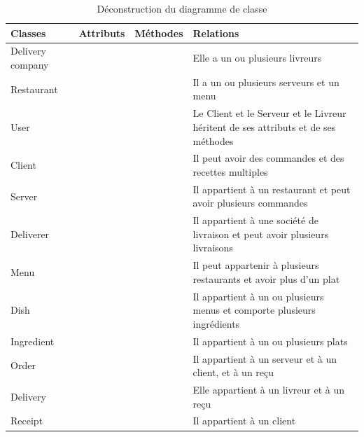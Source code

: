 \documentclass[french, a4paper, 12pt]{report}
\begin{document}
			\begin{table}[!h!]
  				\begin{tabular}{lllp{6cm}}
    					Classes & Attributs & Méthodes & Relations \\ 

					\hline
    					Delivery company & & & Elle a un ou plusieurs livreurs \\  
    					
    					\hline
    					Restaurant & & & Il a un ou plusieurs serveurs et un menu \\   					
    					
    					\hline
    					User & & & Le Client et le Serveur et le Livreur héritent de ses attributs et de ses méthodes \\
    					
					\hline
    					Client & & & Il peut avoir des commandes et des recettes multiples\\  
    					  					
    					\hline
    					Server & & & Il appartient à un restaurant et peut avoir plusieurs commandes \\
    					
    					\hline
    					Deliverer & & & Il appartient à une société de livraison et peut avoir plusieurs livraisons \\
    					    					
    					\hline
    					Menu & & & Il peut appartenir à plusieurs restaurants et avoir plus d'un plat\\
    					
    					\hline
					Dish & & & Il appartient à un ou plusieurs menus et comporte plusieurs ingrédients \\

						
					\hline
					Ingredient & & & Il appartient à un ou plusieurs plats \\
						
					\hline
					Order & & & Il appartient à un serveur et à un client, et à un reçu \\
						
					\hline
					Delivery & & & Elle appartient à un livreur et à un reçu \\
						
					\hline	
					Receipt & & & Il appartient à un client \\
    					
  				\end{tabular}
  				\caption{Déconstruction du diagramme de classe}
  				\label{tab:classdiag}
			\end{table}
\end{document}
